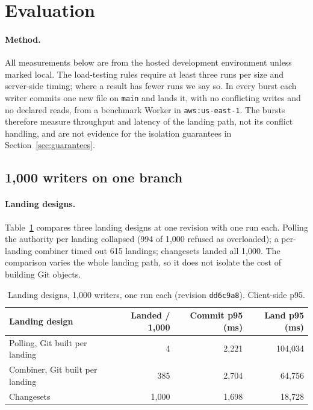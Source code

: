 \documentclass[11pt]{article}
\newcommand{\code}[1]{\texttt{#1}}
\begin{document}
\section{Evaluation}
\label{sec:eval}

\paragraph{Method.} All measurements below are from the hosted development environment
unless marked local. The load-testing rules require at least three runs per size and
server-side timing; where a result has fewer runs we say so. In every burst each writer
commits one new file on \code{main} and lands it, with no conflicting writes and no
declared reads, from a benchmark Worker in \code{aws:us-east-1}. The bursts therefore
measure throughput and latency of the landing path, not its conflict handling, and are
not evidence for the isolation guarantees in Section~\ref{sec:guarantees}.

\subsection{1,000 writers on one branch}

\paragraph{Landing designs.} Table~\ref{tab:modes} compares three landing designs at
one revision with one run each. Polling the authority per landing collapsed (994 of
1,000 refused as overloaded); a per-landing combiner timed out 615 landings; changesets
landed all 1,000. The comparison varies the whole landing path, so it does not isolate
the cost of building Git objects.

\begin{table}[t]
\centering
\small
\begin{tabular}{@{}lrrr@{}}
\toprule
Landing design & Landed / 1,000 & Commit p95 (ms) & Land p95 (ms) \\
\midrule
Polling, Git built per landing & 4 & 2,221 & 104,034 \\
Combiner, Git built per landing & 385 & 2,704 & 64,756 \\
Changesets & 1,000 & 1,698 & 18,728 \\
\bottomrule
\end{tabular}
\caption{Landing designs, 1,000 writers, one run each (revision \code{dd6c9a8}). Client-side p95.}
\label{tab:modes}
\end{table}
\end{document}
